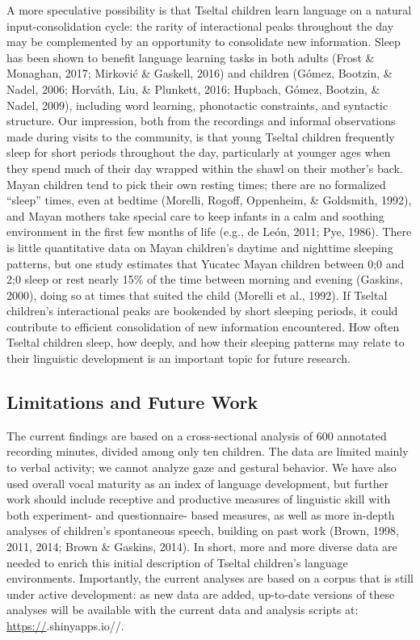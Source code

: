 \documentclass[floatsintext,man]{apa6}
\theoremstyle{definition}
\theoremstyle{definition}
\theoremstyle{definition}
\theoremstyle{remark}
\begin{document}
A more speculative possibility is that Tseltal children learn language
on a natural input-consolidation cycle: the rarity of interactional
peaks throughout the day may be complemented by an opportunity to
consolidate new information. Sleep has been shown to benefit language
learning tasks in both adults (Frost \& Monaghan, 2017; Mirković \&
Gaskell, 2016) and children (Gómez, Bootzin, \& Nadel, 2006; Horváth,
Liu, \& Plunkett, 2016; Hupbach, Gómez, Bootzin, \& Nadel, 2009),
including word learning, phonotactic constraints, and syntactic
structure. Our impression, both from the recordings and informal
observations made during visits to the community, is that young Tseltal
children frequently sleep for short periods throughout the day,
particularly at younger ages when they spend much of their day wrapped
within the shawl on their mother's back. Mayan children tend to pick
their own resting times; there are no formalized \enquote{sleep} times,
even at bedtime (Morelli, Rogoff, Oppenheim, \& Goldsmith, 1992), and
Mayan mothers take special care to keep infants in a calm and soothing
environment in the first few months of life (e.g., de León, 2011; Pye,
1986). There is little quantitative data on Mayan children's daytime and
nighttime sleeping patterns, but one study estimates that Yucatec Mayan
children between 0;0 and 2;0 sleep or rest nearly 15\% of the time
between morning and evening (Gaskins, 2000), doing so at times that
suited the child (Morelli et al., 1992). If Tseltal children's
interactional peaks are bookended by short sleeping periods, it could
contribute to efficient consolidation of new information encountered.
How often Tseltal children sleep, how deeply, and how their sleeping
patterns may relate to their linguistic development is an important
topic for future research.

\subsection{Limitations and Future Work}\label{disc-limfut}

The current findings are based on a cross-sectional analysis of 600
annotated recording minutes, divided among only ten children. The data
are limited mainly to verbal activity; we cannot analyze gaze and
gestural behavior. We have also used overall vocal maturity as an index
of language development, but further work should include receptive and
productive measures of linguistic skill with both experiment- and
questionnaire- based measures, as well as more in-depth analyses of
children's spontaneous speech, building on past work (Brown, 1998, 2011,
2014; Brown \& Gaskins, 2014). In short, more and more diverse data are
needed to enrich this initial description of Tseltal children's language
environments. Importantly, the current analyses are based on a corpus
that is still under active development: as new data are added,
up-to-date versions of these analyses will be available with the current
data and analysis scripts at: \url{https://}.shinyapps.io//.
\end{document}
